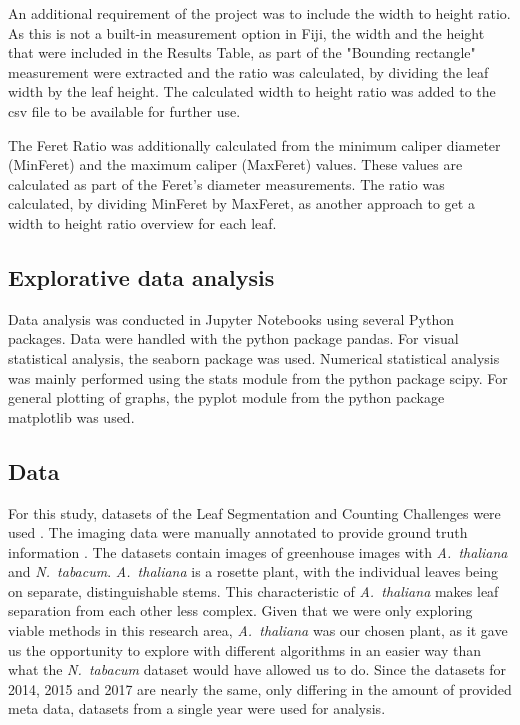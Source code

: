 \documentclass[paper=A4,bibliography=totocnumbered]{scrartcl}
\begin{document}
An additional requirement of the project was to include the width to height ratio. As this is not a built-in measurement option in Fiji, the width and the height that were included in the Results Table, as part of the "Bounding rectangle" measurement were extracted and the ratio was calculated, by dividing the leaf width by the leaf height. The calculated width to height ratio was added to the csv file to be available for further use.

The Feret Ratio was additionally calculated from the minimum caliper diameter (MinFeret) and the maximum caliper (MaxFeret) values. These values are calculated as part of the Feret's diameter measurements. The ratio was calculated, by dividing MinFeret by MaxFeret, as another approach to get a width to height ratio overview for each leaf.

\subsection{Explorative data analysis}
Data analysis was conducted in Jupyter Notebooks using several Python packages. Data were handled with the python package pandas. For visual statistical analysis, the seaborn package was used. Numerical statistical analysis was mainly performed using the stats module from the python package scipy. For general plotting of graphs, the pyplot module from the python package matplotlib was used.

\subsection{Data}
For this study, datasets of the Leaf Segmentation and Counting Challenges were used \citep{Minervini.2016}. The imaging data were manually annotated to provide ground truth information \citep{Scharr.2014}. The datasets contain images of greenhouse images with \textit{A.~thaliana} and \textit{N.~tabacum}. \textit{A.~thaliana} is a rosette plant, with the individual leaves being on separate, distinguishable stems. This characteristic of \textit{A.~thaliana} makes leaf separation from each other less complex.  Given that we were only exploring viable methods in this research area, \textit{A.~thaliana} was our chosen plant, as it gave us the opportunity to explore with different algorithms in an easier way than what the \textit{N.~tabacum} dataset would have allowed us to do. Since the datasets for 2014, 2015 and 2017 are nearly the same, only differing in the amount of provided meta data, datasets from a single year were used for analysis. 
\end{document}
